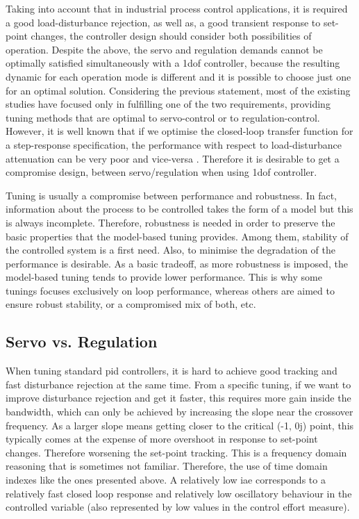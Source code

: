 Taking into account that in industrial process control applications, it is required a good load-disturbance rejection, as well as, a good transient response to set-point changes, the controller design should consider both possibilities of operation. Despite the above, the servo and regulation demands cannot be optimally satisfied simultaneously with a \gls{1dof} controller, because the resulting dynamic for each operation mode is different and it is possible to choose just one for an optimal solution. Considering the previous statement, most of the existing studies have focused only in fulfilling one of the two requirements, providing tuning methods that are optimal to servo-control or to regulation-control. However, it is well known that if we optimise the closed-loop transfer function for a step-response specification, the performance with respect to load-disturbance attenuation can be very poor and vice-versa \cite{Arrieta2010a}. Therefore it is desirable to get a compromise design, between servo/regulation when using \gls{1dof} controller.

Tuning is usually a compromise between performance and robustness. In fact, information about the process to be controlled takes the form of a model but this is always incomplete. Therefore, robustness is needed in order to preserve the basic properties that the model-based tuning provides. Among them, stability of the controlled system is a first need. Also, to minimise the degradation of the performance is desirable. As a basic tradeoff, as more robustness is imposed, the model-based tuning tends to provide lower performance. This is why some tunings focuses exclusively on loop performance, whereas others are aimed to ensure robust stability, or a compromised mix of both, etc. 

\subsection{Servo vs. Regulation}
%
When tuning standard \gls{pid} controllers, it is hard to achieve good tracking and fast disturbance rejection at the same time. From a specific tuning, if we want to improve disturbance rejection and get it faster, this requires more gain inside the bandwidth, which can only be achieved by increasing the slope near the crossover frequency. As a larger slope means getting closer to the critical (-1, 0j) point, this typically comes at the expense of more overshoot in response to set-point changes. Therefore worsening the set-point tracking. This is a frequency domain reasoning that is sometimes not familiar. Therefore, the use of time domain indexes like the ones presented above. A relatively low \gls{iae} corresponds to a relatively fast closed loop response and relatively low oscillatory behaviour in the controlled variable (also represented by low values in the control effort measure). 
 
